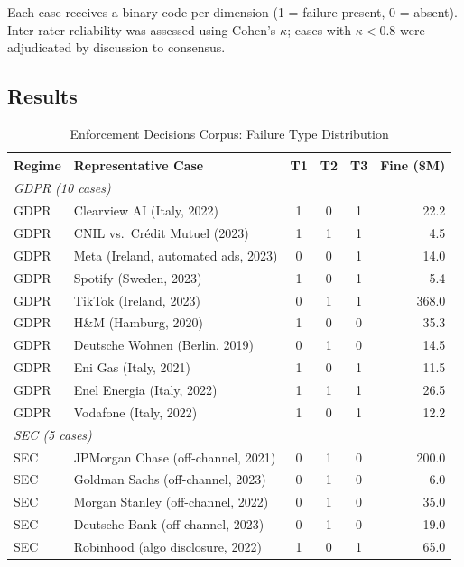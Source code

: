 Each case receives a binary code per dimension (1 = failure present,
0 = absent). Inter-rater reliability was assessed using Cohen's
$\kappa$; cases with $\kappa < 0.8$ were adjudicated by discussion
to consensus.

\subsection{Results}
\label{subsec:forensic-results}

\begin{table}[h]
\centering
\caption{Enforcement Decisions Corpus: Failure Type Distribution}
\label{tab:enforcement-cases}
\begin{tabular}{llccc r}
\toprule
\textbf{Regime} & \textbf{Representative Case} & \textbf{T1} & \textbf{T2} & \textbf{T3} & \textbf{Fine (\$M)} \\
\midrule
\multicolumn{6}{l}{\textit{GDPR (10 cases)}} \\
GDPR & Clearview AI (Italy, 2022)          & 1 & 0 & 1 & 22.2 \\
GDPR & CNIL vs.~Crédit Mutuel (2023)       & 1 & 1 & 1 & 4.5  \\
GDPR & Meta (Ireland, automated ads, 2023) & 0 & 0 & 1 & 14.0 \\
GDPR & Spotify (Sweden, 2023)              & 1 & 0 & 1 & 5.4  \\
GDPR & TikTok (Ireland, 2023)              & 0 & 1 & 1 & 368.0 \\
GDPR & H\&M (Hamburg, 2020)               & 1 & 0 & 0 & 35.3  \\
GDPR & Deutsche Wohnen (Berlin, 2019)      & 0 & 1 & 0 & 14.5  \\
GDPR & Eni Gas (Italy, 2021)               & 1 & 0 & 1 & 11.5  \\
GDPR & Enel Energia (Italy, 2022)          & 1 & 1 & 1 & 26.5  \\
GDPR & Vodafone (Italy, 2022)              & 1 & 0 & 1 & 12.2  \\
\midrule
\multicolumn{6}{l}{\textit{SEC (5 cases)}} \\
SEC  & JPMorgan Chase (off-channel, 2021)  & 0 & 1 & 0 & 200.0 \\
SEC  & Goldman Sachs (off-channel, 2023)   & 0 & 1 & 0 & 6.0   \\
SEC  & Morgan Stanley (off-channel, 2022)  & 0 & 1 & 0 & 35.0  \\
SEC  & Deutsche Bank (off-channel, 2023)   & 0 & 1 & 0 & 19.0  \\
SEC  & Robinhood (algo disclosure, 2022)   & 1 & 0 & 1 & 65.0  \\

\end{tabular}
\end{table}
